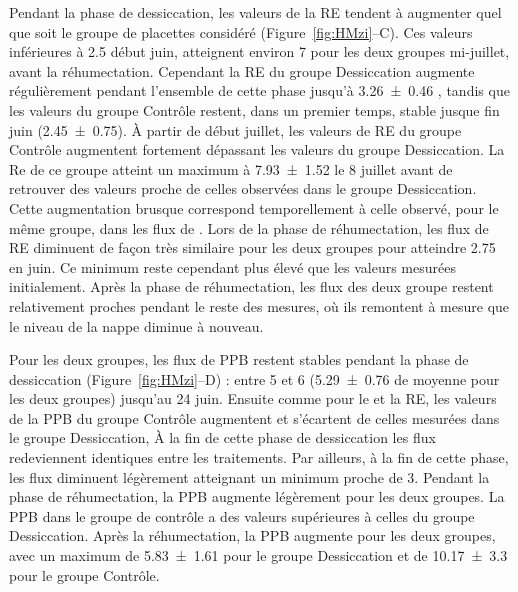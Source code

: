 Pendant la phase de dessiccation, les valeurs de la RE tendent à augmenter quel que soit le groupe de placettes considéré (Figure~\ref{fig:HMzi}--C).
Ces valeurs inférieures à \SI{2.5}{\uml} début juin, atteignent environ \SI{7}{\uml} pour les deux groupes mi-juillet, avant la réhumectation.
Cependant la RE du groupe Dessiccation augmente régulièrement pendant l'ensemble de cette phase jusqu'à \SI{3.26(046)}{\uml} , tandis que les valeurs du groupe Contrôle restent, dans un premier temps, stable jusque fin juin (\SI{2.45(075)}{\uml}).
À partir de début juillet, les valeurs de RE du groupe Contrôle augmentent fortement dépassant les valeurs du groupe Dessiccation.
La Re de ce groupe atteint un maximum à \SI{7.93(152)}{\uml} le 8 juillet avant de retrouver des valeurs proche de celles observées dans le groupe Dessiccation.
Cette augmentation brusque correspond temporellement à celle observé, pour le même groupe, dans les flux de \chh.
Lors de la phase de réhumectation, les flux de RE diminuent de façon très similaire pour les deux groupes pour atteindre \SI{2.75}{\uml} en juin.
Ce minimum reste cependant plus élevé que les valeurs mesurées initialement.
Après la phase de réhumectation, les flux des deux groupe restent relativement proches pendant le reste des mesures, où ils remontent à mesure que le niveau de la nappe diminue à nouveau.

Pour les deux groupes, les flux de PPB restent stables pendant la phase de dessiccation (Figure~\ref{fig:HMzi}--D) :
entre 5 et \SI{6}{\uml} (\SI{5.29(076)}{\uml} de moyenne pour les deux groupes) jusqu'au 24 juin.
Ensuite comme pour le \chh et la RE, les valeurs de la PPB du groupe Contrôle augmentent et s'écartent de celles mesurées dans le groupe Dessiccation,
À la fin de cette phase de dessiccation les flux redeviennent identiques entre les traitements.
Par ailleurs, à la fin de cette phase, les flux diminuent légèrement atteignant un minimum proche de \SI{3}{\uml}.
Pendant la phase de réhumectation, la PPB augmente légèrement pour les deux groupes.
La PPB dans le groupe de contrôle a des valeurs supérieures à celles du groupe Dessiccation.
Après la réhumectation, la PPB augmente pour les deux groupes, avec un maximum de \SI{5.83(161)}{\uml} pour le groupe Dessiccation et de \SI{10.17(330)}{\uml} pour le groupe Contrôle.


